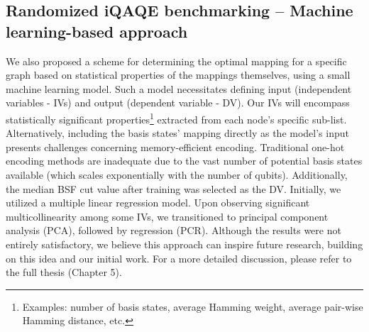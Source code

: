 \subsection{Randomized iQAQE benchmarking -- Machine learning-based approach}
\label{subsection:Randomized_iQAQE_ML}
We also proposed a scheme for determining the optimal mapping for a specific graph based on statistical properties of the mappings themselves, using a small machine learning model. Such a model necessitates defining input (independent variables - IVs) and output (dependent variable - DV). Our IVs will encompass statistically significant properties\footnote{Examples: number of basis states, average Hamming weight, average pair-wise Hamming distance, etc.} extracted from each node's specific sub-list. Alternatively, including the basis states' mapping directly as the model's input presents challenges concerning memory-efficient encoding. Traditional one-hot encoding methods are inadequate due to the vast number of potential basis states available (which scales exponentially with the number of qubits). Additionally, the median BSF cut value after training was selected as the DV. Initially, we utilized a multiple linear regression model. Upon observing significant multicollinearity among some IVs, we transitioned to principal component analysis (PCA), followed by regression (PCR). Although the results were not entirely satisfactory, we believe this approach can inspire future research, building on this idea and our initial work. For a more detailed discussion, please refer to the full thesis (Chapter 5).